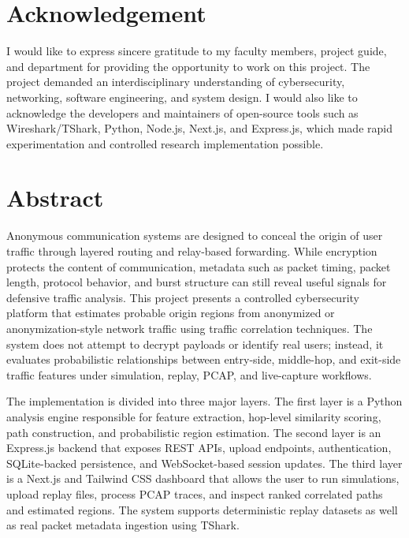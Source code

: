 \documentclass[12pt,a4paper]{report}
\begin{document}
\chapter*{Acknowledgement}
I would like to express sincere gratitude to my faculty members, project guide, and department for providing the opportunity to work on this project. The project demanded an interdisciplinary understanding of cybersecurity, networking, software engineering, and system design. I would also like to acknowledge the developers and maintainers of open-source tools such as Wireshark/TShark, Python, Node.js, Next.js, and Express.js, which made rapid experimentation and controlled research implementation possible.

\tableofcontents
\listoftables
\listoffigures

\clearpage
{}

\chapter*{Abstract}
Anonymous communication systems are designed to conceal the origin of user traffic through layered routing and relay-based forwarding. While encryption protects the content of communication, metadata such as packet timing, packet length, protocol behavior, and burst structure can still reveal useful signals for defensive traffic analysis. This project presents a controlled cybersecurity platform that estimates probable origin regions from anonymized or anonymization-style network traffic using traffic correlation techniques. The system does not attempt to decrypt payloads or identify real users; instead, it evaluates probabilistic relationships between entry-side, middle-hop, and exit-side traffic features under simulation, replay, PCAP, and live-capture workflows.

The implementation is divided into three major layers. The first layer is a Python analysis engine responsible for feature extraction, hop-level similarity scoring, path construction, and probabilistic region estimation. The second layer is an Express.js backend that exposes REST APIs, upload endpoints, authentication, SQLite-backed persistence, and WebSocket-based session updates. The third layer is a Next.js and Tailwind CSS dashboard that allows the user to run simulations, upload replay files, process PCAP traces, and inspect ranked correlated paths and estimated regions. The system supports deterministic replay datasets as well as real packet metadata ingestion using TShark.
\end{document}
